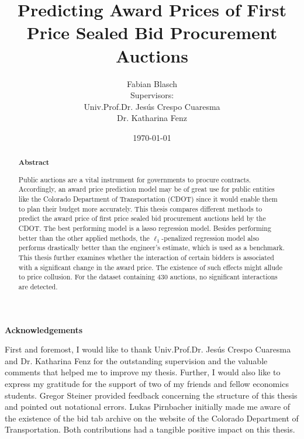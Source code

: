 \documentclass[a4paper,12pt, headsepline]{scrartcl}
\title{Predicting Award Prices of First Price Sealed Bid Procurement Auctions}
\date{\today}
\author{Fabian Blasch\\[0.47cm]Supervisors:\\Univ.Prof.Dr. Jesús Crespo Cuaresma\\Dr. Katharina Fenz}
\numberwithin{equation}{section}
\begin{document}
\begin{titlingpage}
\maketitle
\begin{abstract}
\begin{center}
	\textbf{Abstract}
\end{center}
\vspace*{2pt}
Public auctions are a vital instrument for governments to procure contracts. Accordingly, an award price prediction model may be of great use for public entities like the Colorado Department of Transportation (CDOT) since it would enable them to plan their budget more accurately. This thesis compares different methods to predict the award price of first price sealed bid procurement auctions held by the CDOT. The best performing model is a lasso regression model. Besides performing better than the other applied methods, the $\ell_1$-penalized regression model also performs drastically better than the engineer's estimate, which is used as a benchmark. This thesis further examines whether the interaction of certain bidders is associated with a significant change in the award price. The existence of such effects might allude to price collusion. For the dataset containing 430 auctions, no significant interactions are detected.
\end{abstract}
\end{titlingpage}
\newpage
\thispagestyle{empty}
\vspace*{6.5cm}
\begin{center}
\textbf{Acknowledgements}
\end{center}
\vspace*{-17pt}
First and foremost, I would like to thank Univ.Prof.Dr. Jesús Crespo Cuaresma and Dr. Katharina Fenz for the outstanding supervision and the valuable comments that helped me to improve my thesis. Further, I would also like to express my gratitude for the support of two of my friends and fellow economics students. Gregor Steiner provided feedback concerning the structure of this thesis and pointed out notational errors. Lukas Pirnbacher initially made me aware of the existence of the bid tab archive on the website of the Colorado Department of Transportation. Both contributions had a tangible positive impact on this thesis.
\newpage
\tableofcontents
\thispagestyle{empty}
\clearpage
{} 
\end{document}
